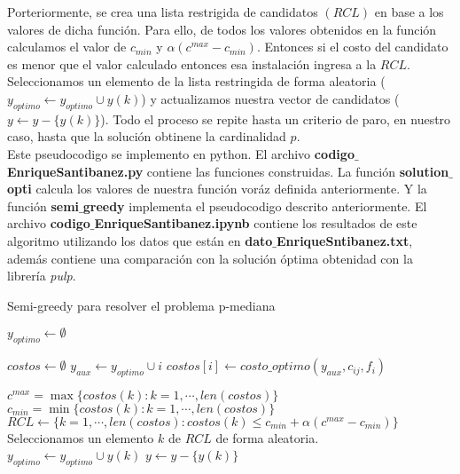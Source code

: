 \documentclass[11pt,letterpaper]{article}
\begin{document}
Porteriormente, se crea una lista restrigida de candidatos $(RCL)$ en base a los valores de dicha función. Para ello, de todos los valores obtenidos en la función calculamos el valor de $c_{min}$ y $\alpha(c^{max}-c_{min})$. Entonces si el costo del candidato es menor que el valor calculado entonces esa instalación ingresa a la $RCL$. \\

Seleccionamos un elemento de la lista restringida de forma aleatoria ($y_{optimo} \leftarrow y_{optimo} \cup y(k)$) y actualizamos nuestra vector de candidatos ($y \leftarrow y-\{ y(k)\}$). Todo el proceso se repite hasta un criterio de paro, en nuestro caso, hasta que la solución obtinene la cardinalidad $p$. \\

Este pseudocodigo se implemento en python. El archivo \textbf{codigo$\_$EnriqueSantibanez.py} contiene las funciones construidas. La función \textbf{solution$\_$opti} calcula los valores de nuestra función voráz definida anteriormente. Y la función \textbf{semi$\_$greedy} implementa el pseudocodigo descrito anteriormente. El archivo \textbf{codigo$\_$EnriqueSantibanez.ipynb} contiene los resultados de este algoritmo utilizando los datos que están en \textbf{dato$\_$EnriqueSntibanez.txt}, además contiene una comparación con la solución óptima obtenidad con la librería \textit{pulp}.

\begin{algorithm}[H]
  \caption{Semi-greedy para resolver el problema p-mediana} \label{a_semi_greedy}
  \begin{algorithmic}[1]
 

    \State $y_{optimo} \leftarrow \emptyset$
 
    \State $costos \leftarrow \emptyset$
      \State $y_{aux} \leftarrow y_{optimo} \cup i $
      \State $costos[i]\leftarrow costo\_optimo(y_{aux}, c_{ij}, f_{i})$
      \EndFor
      
      \State $c^{max} = \max\{ costos(k): k= 1,\cdots , len(costos) \}$
      \State $c_{min} = \min\{ costos(k): k= 1,\cdots , len(costos) \}$ 
      \State $RCL \leftarrow \{k=1, \cdots, len(costos) :costos(k)\leq c_{min}+\alpha (c^{max}-c_{min}) \}$
      \State Seleccionamos un elemento $k$ de $RCL$ de forma aleatoria.
      \State $y_{optimo} \leftarrow y_{optimo} \cup y(k)$
      \State $y \leftarrow y-\{ y(k)\}$
    \EndWhile
 
    
  \end{algorithmic}
\end{algorithm}
\printbibliography
\end{document}
